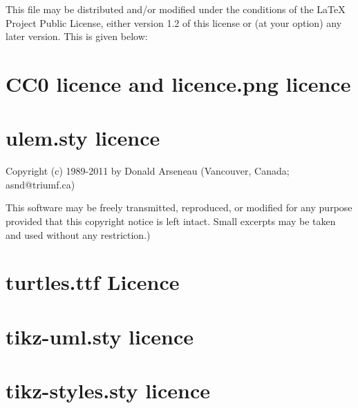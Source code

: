 This file may be distributed and/or modified under the conditions of the LaTeX
Project Public License, either version 1.2 of this license or (at your option)
any later version. This is given below:


\section{CC0 licence and licence.png licence}


\section{ulem.sty licence}
Copyright (c) 1989-2011 by Donald Arseneau (Vancouver, Canada; asnd@triumf.ca)

This software may be freely transmitted, reproduced, or modified for any purpose
provided that this copyright notice is left intact. Small excerpts may be taken
and used without any restriction.)

\section{turtles.ttf Licence}

\section{tikz-uml.sty licence}

\section{tikz-styles.sty licence}

